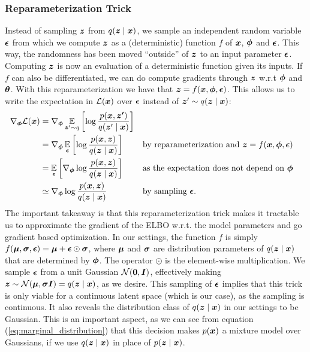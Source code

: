\subsubsection{Reparameterization Trick}
Instead of sampling $\bm{ z }$ from $q(\bm{ z } \mid \bm{ x })$, we sample an independent random variable $\bm{ \epsilon }$ from which we compute $\bm{ z }$ as a (deterministic) function $f$ of $\bm{ x }$, $\bm{ \phi }$ and $\bm{ \epsilon }$. This way, the randomness has been moved ``outside'' of $\bm{ z }$ to an input parameter $\bm{ \epsilon }$. Computing $\bm{ z }$ is now an evaluation of a deterministic function given its inputs. If $f$ can also be differentiated, we can do compute gradients through $\bm{ z }$ w.r.t $\bm{ \phi }$ and $\bm{ \theta }$. With this reparameterization we have that $\bm{ z } = f(\bm{ x }, \bm{ \phi }, \bm{ \epsilon })$. This allows us to write the expectation in $\mathcal{L}(\bm{ x })$ over $\bm{ \epsilon }$ instead of $\bm{ z }' \sim q(\bm{ z } \mid \bm{ x })$:
\begin{align*}
\nabla_{\bm{ \phi }}\mathcal{L}(\bm{ x }) &= \nabla_{\bm{ \phi }} \operatorname*{\mathbb{E}}_{\bm{ z }'\sim q}{\mathopen{} \left[ \log \frac{p(\bm{ x }, \bm{ z' })}{q(\bm{ z }' \mid \bm{ x })} \right] \mathclose{}}\\
&= \nabla_{\bm{ \phi }} \operatorname*{\mathbb{E}}_{\bm{ \epsilon }}{\mathopen{} \left[ \log \frac{p(\bm{ x }, \bm{ z })}{q(\bm{ z } \mid \bm{ x })} \right] \mathclose{}} &&\text{by reparameterization and $\bm{ z } = f(\bm{ x }, \bm{ \phi }, \bm{ \epsilon })$}\\
&= \operatorname*{\mathbb{E}}_{\bm{ \epsilon }}{\mathopen{} \left[ \nabla_{\bm{ \phi }} \log \frac{p(\bm{ x }, \bm{ z })}{q(\bm{ z } \mid \bm{ x })} \right] \mathclose{}} &&\text{as the expectation does not depend on $\bm{ \phi }$}\\
&\simeq \nabla_{\bm{ \phi }} \log \frac{p(\bm{ x }, \bm{ z })}{q(\bm{ z } \mid \bm{ x })} &&\text{by sampling $\bm{ \epsilon }$.}
\end{align*}
The important takeaway is that this reparameterization trick makes it tractable us to approximate the gradient of the ELBO w.r.t. the model parameters and go gradient based optimization. In our settings, the function $f$ is simply $f(\bm{ \mu }, \bm{ \sigma }, \bm{ \epsilon }) = \bm{ \mu } + \bm{ \epsilon } \odot \bm{ \sigma }$, where $\bm{ \mu }$ and $\bm{ \sigma }$ are distribution parameters of $q(\bm{ z } \mid \bm{ x })$ that are determined by $\bm{ \phi }$. The operator $\odot$ is the element-wise multiplication. We sample $\bm{ \epsilon }$ from a unit Gaussian $\mathcal{N}{\mathopen{} \left( \bm{ 0 }, \bm{ I } \right) \mathclose{}}$, effectively making $\bm{ z } \sim \mathcal{N}{\mathopen{} \left( \bm{ \mu }, \bm{ \sigma I } \right) \mathclose{}} = q(\bm{ z } \mid \bm{ x })$, as we desire. This sampling of $\bm{ \epsilon }$ implies that this trick is only viable for a continuous latent space (which is our case), as the sampling is continuous. It also reveals the distribution class of $q(\bm{ z } \mid \bm{ x })$ in our settings to be Gaussian. This is an important aspect, as we can see from equation (\ref{eq:marginal_distribution}) that this decision makes $p(\bm{ x })$ a mixture model over Gaussians, if we use $q(\bm{ z } \mid \bm{ x })$ in place of $p(\bm{ z } \mid \bm{ x })$.

